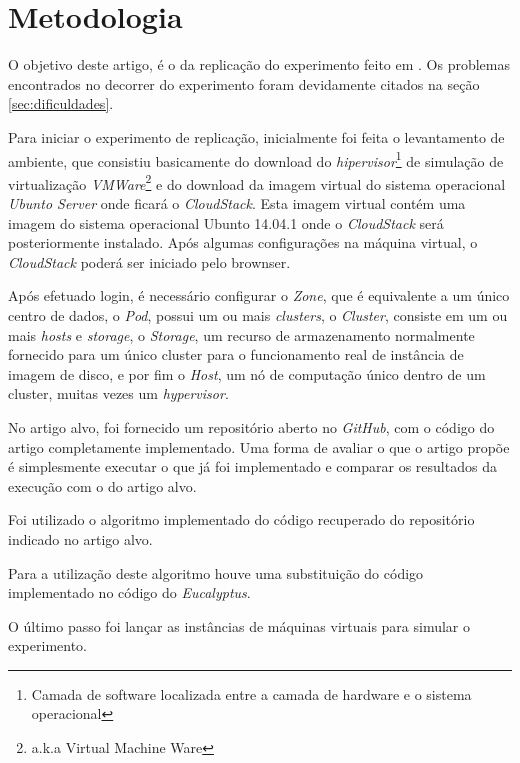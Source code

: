\section{Metodologia}

O objetivo deste artigo, é o da replicação do experimento feito em \cite{coutinho_et_al:14}. Os problemas encontrados no decorrer do experimento foram devidamente citados na seção \ref{sec:dificuldades}.

Para iniciar o experimento de replicação, inicialmente foi feita o levantamento de ambiente, que consistiu basicamente do download do \textit{hipervisor}\footnote{Camada de software localizada entre a camada de hardware e o sistema operacional\cite{dev_midia}} de simulação de virtualização \textit{VMWare}\footnote{a.k.a Virtual Machine Ware} e do download da imagem virtual do sistema operacional \textit{Ubunto Server} onde ficará o \textit{CloudStack}. Esta imagem virtual contém uma imagem do sistema operacional Ubunto 14.04.1 onde o \textit{CloudStack} será posteriormente instalado. Após algumas configurações na máquina virtual, o \textit{CloudStack} poderá ser iniciado pelo brownser. 

Após efetuado login, é necessário configurar o \textit{Zone}, que é equivalente a um único centro de dados, o \textit{Pod}, possui um ou mais \textit{clusters}, o \textit{Cluster}, consiste em um ou mais \textit{hosts} e \textit{storage}, o \textit{Storage}, um recurso de armazenamento normalmente fornecido para um único cluster para o funcionamento real de instância de imagem de disco, e por fim o \textit{Host}, um nó de computação único dentro de um cluster, muitas vezes um \textit{hypervisor}.

No artigo alvo, foi fornecido um repositório aberto no \textit{GitHub}, com o código do artigo completamente implementado. Uma forma de avaliar o que o artigo propõe é simplesmente executar o que já foi implementado e comparar os resultados da execução com o do artigo alvo.

Foi utilizado o algoritmo implementado do código recuperado do repositório indicado no artigo alvo.

Para a utilização deste algoritmo houve uma substituição do código implementado no código do \textit{Eucalyptus}.

O último passo foi lançar as instâncias de máquinas virtuais para simular o experimento. 
